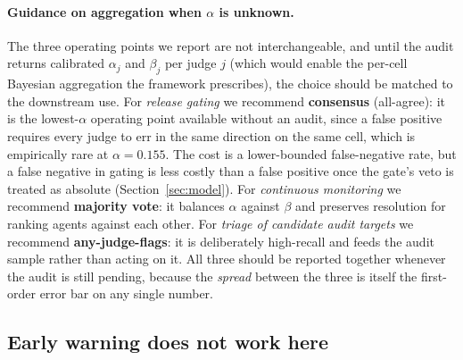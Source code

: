 \documentclass{article}
\begin{document}
\paragraph{Guidance on aggregation when $\alpha$ is unknown.}
The three operating points we report are not interchangeable, and until the audit returns calibrated $\alpha_j$ and $\beta_j$ per judge $j$ (which would enable the per-cell Bayesian aggregation the framework prescribes), the choice should be matched to the downstream use. For \emph{release gating} we recommend \textbf{consensus} (all-agree): it is the lowest-$\alpha$ operating point available without an audit, since a false positive requires every judge to err in the same direction on the same cell, which is empirically rare at $\alpha=0.155$. The cost is a lower-bounded false-negative rate, but a false negative in gating is less costly than a false positive once the gate's veto is treated as absolute (Section~\ref{sec:model}). For \emph{continuous monitoring} we recommend \textbf{majority vote}: it balances $\alpha$ against $\beta$ and preserves resolution for ranking agents against each other. For \emph{triage of candidate audit targets} we recommend \textbf{any-judge-flags}: it is deliberately high-recall and feeds the audit sample rather than acting on it. All three should be reported together whenever the audit is still pending, because the \emph{spread} between the three is itself the first-order error bar on any single number.

\subsection{Early warning does not work here}
\end{document}
